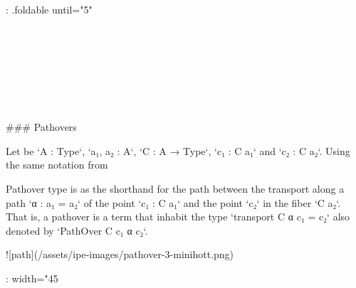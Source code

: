 {{: .foldable until="5" }
\begin{code}%
\>[0]\<%
\\
\>[0][@{}l@{\AgdaIndent{0}}]%
\>[2]\AgdaSymbol{:}\AgdaSpace{}%
\AgdaSpace{}%
\AgdaSymbol{\{}\AgdaSpace{}%
\AgdaSpace{}%
\AgdaSymbol{:}\AgdaSpace{}%
\AgdaSpace{}%
\AgdaSymbol{\}}\<%
\\
%
\>[2]\AgdaSpace{}%
\AgdaSpace{}%
\AgdaOperator{\AgdaDatatype{==}}\AgdaSpace{}%
\<%
\\
%
\>[2]\AgdaComment{---------}\<%
\\
%
\>[2]\AgdaSpace{}%
\AgdaSymbol{(}\AgdaSpace{}%
\AgdaSpace{}%
\AgdaSymbol{)}\<%
\\
%
\\[\AgdaEmptyExtraSkip]%
\>[0]\AgdaSpace{}%
\AgdaSpace{}%
\AgdaSpace{}%
\AgdaSymbol{=}\AgdaSpace{}%
\AgdaSpace{}%
\AgdaSpace{}%
\AgdaSpace{}%
\AgdaSpace{}%
\AgdaSymbol{)}\AgdaSpace{}%
\AgdaSpace{}%
\<%
\end{code}

### Pathovers

Let be `A : Type`, `a₁, a₂ : A`, `C : A → Type`, `c₁ : C a₁` and `c₂ : C a₂`.
Using the same notation from {%
Pathover type is as the shorthand for the path between the transport along a
path `α : a₁ = a₂` of the point `c₁ : C a₁` and the point `c₂` in the fiber `C
a₂`. That is, a pathover is a term that inhabit the type `transport C α c₁ = c₂`
also denoted by `PathOver C c₁ α c₂`.

![path](/assets/ipe-images/pathover-3-minihott.png){: width="45%

}}}
